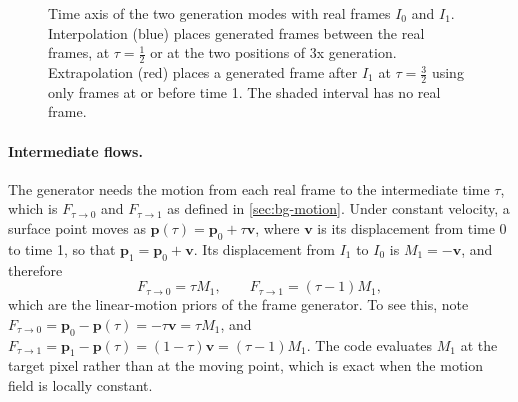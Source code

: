 \begin{figure}[!htbp]
\centering
{}
\caption{Time axis of the two generation modes with real frames $I_0$ and $I_1$. Interpolation (blue) places generated frames between the real frames, at $\tau=\tfrac12$ or at the two positions of 3x generation. Extrapolation (red) places a generated frame after $I_1$ at $\tau=\tfrac32$ using only frames at or before time 1. The shaded interval has no real frame.}\label{fig:bg-tau}
\end{figure}

\paragraph{Intermediate flows.} The generator needs the motion from each real frame to the intermediate time $\tau$, which is $F_{\tau\to0}$ and $F_{\tau\to1}$ as defined in \cref{sec:bg-motion}. Under constant velocity, a surface point moves as $\mathbf p(\tau)=\mathbf p_0+\tau\mathbf v$, where $\mathbf v$ is its displacement from time 0 to time 1, so that $\mathbf p_1=\mathbf p_0+\mathbf v$. Its displacement from $I_1$ to $I_0$ is $M_1=-\mathbf v$, and therefore
\begin{equation}
F_{\tau\to0}=\tau M_1,\qquad F_{\tau\to1}=(\tau-1)M_1,\label{eq:bg-linear}
\end{equation}
which are the linear-motion priors of the frame generator. To see this, note $F_{\tau\to0}=\mathbf p_0-\mathbf p(\tau)=-\tau\mathbf v=\tau M_1$, and $F_{\tau\to1}=\mathbf p_1-\mathbf p(\tau)=(1-\tau)\mathbf v=(\tau-1)M_1$. The code evaluates $M_1$ at the target pixel rather than at the moving point, which is exact when the motion field is locally constant.

